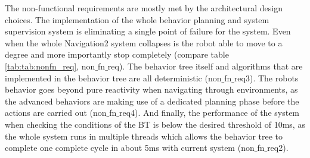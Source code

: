 The non-functional requirements are mostly met by the architectural design choices. 
The implementation of the whole behavior planning and system supervision system is eliminating a single point of failure for the system. Even when the whole Navigation2 system collapses is the robot able to move to a degree and more importantly stop completely (compare table \ref{tab:tab:nonfn_req}, non$\_$fn$\_$req). The behavior tree itself and algorithms that are implemented in the behavior tree are all deterministic (non$\_$fn$\_$req3). The robots behavior goes beyond pure reactivity when navigating through environments, as the advanced behaviors are making use of a dedicated planning phase before the actions are carried out (non$\_$fn$\_$req4). 
And finally, the performance of the system when checking the conditions of the BT is below the desired threshold of 10ms, as the whole system runs in multiple threads which allows the behavior tree to complete one complete cycle in about 5ms with current system (non$\_$fn$\_$req2). 
